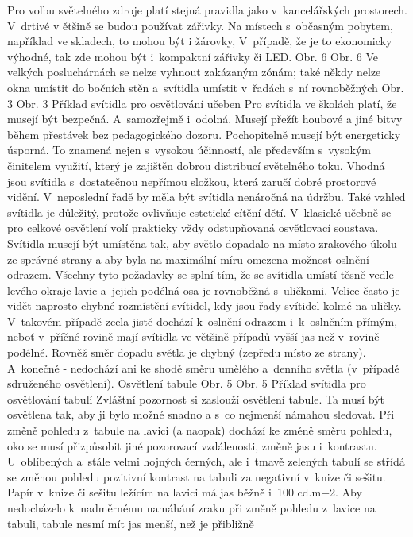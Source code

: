 Pro volbu světelného zdroje platí stejná pravidla jako v~kancelářských prostorech. V~drtivé v
ětšině se budou používat zářivky. Na místech s~občasným pobytem, například ve skladech, to mohou být
i žárovky, V~případě, že je to ekonomicky výhodné, tak zde mohou být i~kompaktní zářivky či LED.
Obr. 6
Obr. 6 Ve velkých posluchárnách se nelze vyhnout zakázaným zónám; také někdy nelze okna umístit
do bočních stěn a~svítidla umístit v~řadách s~ní rovnoběžných
Obr. 3
Obr. 3 Příklad svítidla pro osvětlování učeben
\medskip
Pro svítidla ve školách platí, že musejí být bezpečná. A~samozřejmě i~odolná. Musejí přežít houbové
a jiné bitvy během přestávek bez pedagogického dozoru. Pochopitelně musejí být energeticky úsporná.
To znamená nejen s~vysokou účinností, ale především s~vysokým činitelem využití, který je zajištěn
dobrou distribucí světelného toku. Vhodná jsou svítidla s~dostatečnou nepřímou složkou, která zaručí
dobré prostorové vidění. V~neposlední řadě by měla být svítidla nenáročná na údržbu.
Také vzhled svítidla je důležitý, protože ovlivňuje estetické cítění dětí.
\medskip
V~klasické učebně se pro celkové osvětlení volí prakticky vždy odstupňovaná osvětlovací soustava.
Svítidla musejí být umístěna tak, aby světlo dopadalo na místo zrakového úkolu ze správné strany
a aby byla na maximální míru omezena možnost oslnění odrazem. Všechny tyto požadavky se splní tím,
že se svítidla umístí těsně vedle levého okraje lavic a~jejich podélná osa je rovnoběžná s~uličkami.
Velice často je vidět naprosto chybné rozmístění svítidel, kdy jsou řady svítidel kolmé na uličky.
V~takovém případě zcela jistě dochází k~oslnění odrazem i~k~oslněním přímým, neboť v~příčné rovině mají
svítidla ve většině případů vyšší jas než v~rovině podélné. Rovněž směr dopadu světla je chybný
(zepředu místo ze strany). A~konečně - nedochází ani ke shodě směru umělého a~denního světla (v~případě sdruženého osvětlení).
Osvětlení tabule
Obr. 5
Obr. 5 Příklad svítidla pro osvětlování tabulí
\medskip
Zvláštní pozornost si zaslouží osvětlení tabule. Ta musí být osvětlena tak, aby ji bylo možné snadno
a s~co nejmenší námahou sledovat. Při změně pohledu z~tabule na lavici (a naopak) dochází ke změně směru
pohledu, oko se musí přizpůsobit jiné pozorovací vzdálenosti, změně jasu i~kontrastu. U~oblíbených a~stále
velmi hojných černých, ale i~tmavě zelených tabulí se střídá se změnou pohledu pozitivní kontrast
na tabuli za negativní v~knize či sešitu.
\medskip
Papír v~knize či sešitu ležícím na lavici má jas běžně i~100 cd.m−2. Aby nedocházelo k~nadměrnému
namáhání zraku při změně pohledu z~lavice na tabuli, tabule nesmí mít jas menší, než je přibližně
